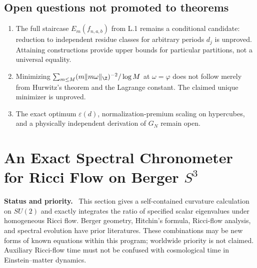 \documentclass[11pt,a4paper,oneside]{book}
\newcommand{\note}[1]{\par\medskip\noindent\textbf{#1}\ }
\begin{document}
\section{Open questions not promoted to theorems}
\begin{enumerate}
\item The full staircase $E_m(f_{n,a,b})$ from L.1 remains a conditional candidate: reduction to independent residue classes for arbitrary periods $d_j$ is unproved. Attaining constructions provide upper bounds for particular partitions, not a universal equality.
\item Minimizing $\sum_{m\le M}(m\|m\omega\|_\Z)^{-2}/\log M$ at $\omega=\varphi$ does not follow merely from Hurwitz's theorem and the Lagrange constant. The claimed unique minimizer is unproved.
\item The exact optimum $\varepsilon(d)$, normalization-premium scaling on hypercubes, and a physically independent derivation of $G_N$ remain open.
\end{enumerate}
\setcounter{equation}{322}


\chapter{An Exact Spectral Chronometer for Ricci Flow on Berger $S^3$}
\note{Status and priority.} This section gives a self-contained curvature calculation on $SU(2)$ and exactly integrates the ratio of specified scalar eigenvalues under homogeneous Ricci flow. Berger geometry, Hitchin's formula, Ricci-flow analysis, and spectral evolution have prior literatures. These combinations may be new forms of known equations within this program; worldwide priority is not claimed. Auxiliary Ricci-flow time must not be confused with cosmological time in Einstein--matter dynamics.
\end{document}
